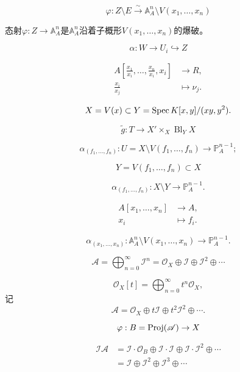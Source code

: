 \[
	\varphi:Z\setminus E\xrightarrow{\sim}\mathbb A_A^n\setminus V(x_1,\dots,x_n)
\]

\begin{pro}\label{pro:4.18}
	态射$\varphi:Z\to \mathbb A_A^n$是$\mathbb A_A^n$沿着子概形$V(x_1,\dots,x_n)$的爆破。
\end{pro}


\[
	\alpha:W\to U_i\hookrightarrow Z
\]

\[
	\begin{aligned}
		A\left[\frac{x_1}{x_i},\dots,\frac{x_n}{x_i},x_i\right] & \longrightarrow R,\\
		\frac{x_i}{x_j}&\longmapsto \nu_j.
	\end{aligned}
\]

\[
	X=V(x)\subset Y=\operatorname{Spec} K[x,y]/(xy,y^2).
\]



\[
	\tilde g:T\to X'\times_X \operatorname{Bl}_Y X
\]

\[
	\alpha_{(f_1,\dots,f_n)}:U=X\setminus V(f_1,\dots,f_n)\longrightarrow \mathbb P_A^{n-1};
\]

\[
	Y=V(f_1,\dots,f_n)\subset X
\]

\[
	\alpha_{(f_1,\dots,f_n)}:X\setminus Y\longrightarrow \mathbb P_A^{n-1}.
\]

\[
	\begin{aligned}
		A\left[x_1,\dots,x_n\right] & \longrightarrow A,\\
		x_i &\longmapsto f_i.
	\end{aligned}
\]

\[
	\alpha_{(x_1,\dots,x_n)}:\mathbb A_A^n\setminus V(x_1,\dots,x_n)\longrightarrow \mathbb P_A^{n-1}.
\]


\[
	\mathscr A=\bigoplus_{n=0}^\infty \mathscr I^n=\mathscr O_X\oplus \mathscr I\oplus \mathscr I^2\oplus \cdots
\]

\[
	\mathscr O_X[t]=\bigoplus_{n=0}^\infty t^n\mathscr O_X,
\]
记
\[
	\mathscr A=\mathscr O_X\oplus t\mathscr I\oplus t^2\mathscr I^2\oplus \cdots.
\]

\[
	\varphi:B=\operatorname{Proj}(\mathscr A)\to X
\]

\[
	\begin{aligned}
	\mathscr I\mathscr A&=\mathscr I\cdot \mathscr O_B\oplus \mathscr I\cdot \mathscr I\oplus \mathscr I\cdot \mathscr I^2 \oplus \cdots\\
	&=\mathscr I\oplus \mathscr I^2 \oplus \mathscr I^3\oplus \cdots
	\end{aligned}
\]

